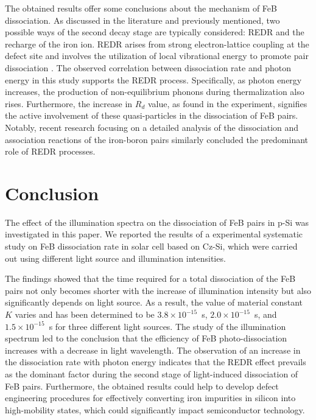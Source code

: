 \documentclass{WileyMSP-template}
\begin{document}
The obtained results offer some conclusions about the mechanism of FeB dissociation.
As discussed in the literature and previously mentioned, two possible ways of the second decay stage
are typically considered: REDR and the recharge of the iron ion.
REDR arises from strong electron-lattice coupling at the defect site
and involves the utilization of local vibrational energy to promote pair dissociation \cite{FeBAssJAP2014,Sun2021,Macdonald2004}.
The observed correlation between dissociation rate and photon energy in this study supports the REDR process.
Specifically, as photon energy increases, the production of non-equilibrium phonons during thermalization also rises.
Furthermore, the increase in $R_d$ value, as found in the experiment, signifies the active involvement of these quasi-particles in the dissociation of FeB pairs.
Notably, recent research \cite{Sun2021} focusing on a detailed analysis of the dissociation and association reactions of the iron-boron pairs similarly concluded the predominant role of REDR processes.



\section{Conclusion}\label{SecConsl}

The effect of the illumination spectra on the dissociation of
FeB pairs in p-Si was investigated in this paper.
We reported the results of a experimental systematic study on FeB dissociation rate in solar cell based on Cz-Si,
which were carried out using different light source and illumination intensities.

The findings showed that the time required for a total dissociation of the FeB pairs
not only becomes shorter with the increase of illumination intensity but also significantly depends
on light source.
As a result, the value of material constant $K$  varies and has been determined to be
$3.8\times10^{-15}$~s, $2.0\times10^{-15}$~s, and $1.5\times10^{-15}$~s
for three different light sources.
The study of the illumination spectrum led to the conclusion that the
efficiency of FeB photo-dissociation increases with a decrease in light wavelength.
The observation of an increase in the dissociation rate
with photon energy indicates that
the REDR effect prevails as the dominant factor during the second stage of light-induced dissociation of FeB pairs.
Furthermore, the obtained results could help to develop defect engineering procedures
for effectively converting iron impurities in silicon into high-mobility states,
which could significantly impact semiconductor technology.
\end{document}
